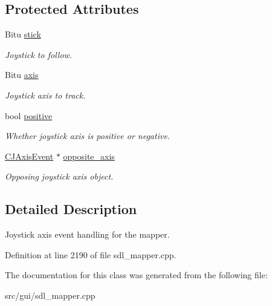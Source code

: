 \subsection*{Protected Attributes}
\begin{DoxyCompactItemize}
\item 
\hypertarget{classCJAxisEvent_a4445db17f0538358d815ab53d449beba}{Bitu \hyperlink{classCJAxisEvent_a4445db17f0538358d815ab53d449beba}{stick}}\label{classCJAxisEvent_a4445db17f0538358d815ab53d449beba}

\begin{DoxyCompactList}\small\item\em Joystick to follow. \end{DoxyCompactList}\item 
\hypertarget{classCJAxisEvent_aef7080ddb8c0a07235865f4f8f33bf90}{Bitu \hyperlink{classCJAxisEvent_aef7080ddb8c0a07235865f4f8f33bf90}{axis}}\label{classCJAxisEvent_aef7080ddb8c0a07235865f4f8f33bf90}

\begin{DoxyCompactList}\small\item\em Joystick axis to track. \end{DoxyCompactList}\item 
\hypertarget{classCJAxisEvent_a90367a0731415ea7dd7b3d01fa153367}{bool \hyperlink{classCJAxisEvent_a90367a0731415ea7dd7b3d01fa153367}{positive}}\label{classCJAxisEvent_a90367a0731415ea7dd7b3d01fa153367}

\begin{DoxyCompactList}\small\item\em Whether joystick axis is positive or negative. \end{DoxyCompactList}\item 
\hypertarget{classCJAxisEvent_aef506ec736efabf7a118af104921a998}{\hyperlink{classCJAxisEvent}{C\-J\-Axis\-Event} $\ast$ \hyperlink{classCJAxisEvent_aef506ec736efabf7a118af104921a998}{opposite\-\_\-axis}}\label{classCJAxisEvent_aef506ec736efabf7a118af104921a998}

\begin{DoxyCompactList}\small\item\em Opposing joystick axis object. \end{DoxyCompactList}\end{DoxyCompactItemize}


\subsection{Detailed Description}
Joystick axis event handling for the mapper. 

Definition at line 2190 of file sdl\-\_\-mapper.\-cpp.



The documentation for this class was generated from the following file\-:\begin{DoxyCompactItemize}
\item 
src/gui/sdl\-\_\-mapper.\-cpp\end{DoxyCompactItemize}
